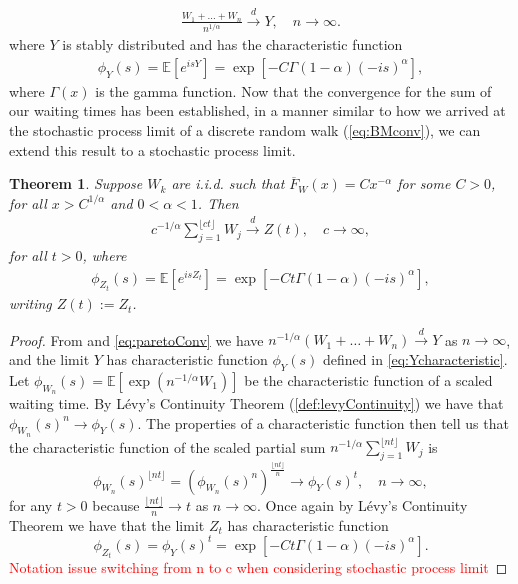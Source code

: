 \documentclass[honours,12pt]{UNSWthesis}
\newcommand{\E}{\mathbb{E}}
\newcommand{\1}{\mathbf 1}
\newcommand{\Floor}[1]{{\lfloor {#1} \rfloor}}
\newcommand{\cd}{\overset{d}{\longrightarrow}}
\newtheorem{theorem}{Theorem}[section]
\numberwithin{equation}{section}
\theoremstyle{definition}
\theoremstyle{remark}
\begin{document}
\begin{align}\label{eq:paretoConv}
	\frac{W_1 + \ldots + W_n}{n^{1/\alpha}} \overset{d}{\longrightarrow} Y, \quad n \to \infty.
\end{align}
\noindent where $Y$ is stably distributed and has the characteristic function
\begin{align}\label{eq:Ycharacteristic}
	\phi_Y(s)=\E[e^{isY}]=\exp[-C\Gamma(1-\alpha)(-is)^\alpha],
\end{align}
\noindent where $\Gamma(x)$ is the gamma function. Now that the convergence for the sum of our waiting times has been established, in a manner similar to how we arrived at the stochastic process limit of a discrete random walk (\ref{eq:BMconv}), we can extend this result to a stochastic process limit.
\begin{theorem}\cite[Th~3.41]{MeerschaertSikorskii2012}
Suppose $W_k$ are i.i.d. such that $\overline F_W(x)=Cx^{-\alpha}$ for some $C>0$, for all $x>C^{1/\alpha}$ and $0<\alpha<1$. Then
\begin{align}\label{eq:partialParetoSum}
	c^{-1/\alpha}\sum\limits^\Floor{ct}_{j=1} W_j \cd Z(t), \quad c \to \infty,
\end{align}
for all $t>0$, where
\begin{align}
	\phi_{Z_t}(s)=\E[e^{isZ_t}]=\exp[-Ct\Gamma(1-\alpha)(-is)^\alpha],
\end{align}
writing $Z(t):=Z_t$.
\end{theorem} 
\begin{proof}
From \cite[Th~3.39]{MeerschaertSikorskii2012} and \ref{eq:paretoConv} we have $n^{-1/\alpha}(W_1 + \ldots + W_n) \overset{d}{\longrightarrow} Y$ as $n \to \infty$, and the limit $Y$ has characteristic function $\phi_Y(s)$ defined in \ref{eq:Ycharacteristic}. Let $\phi_{W_n}(s)=\E[\exp(n^{-1/\alpha}W_1)]$ be the characteristic function of a scaled waiting time. By L\'{e}vy's Continuity Theorem (\ref{def:levyContinuity}) we have that $\phi_{W_n}(s)^n\to \phi_Y(s)$. The properties of a characteristic function then tell us that the characteristic function of the scaled partial sum $n^{-1/\alpha}\sum\limits^\Floor{nt}_{j=1} W_j$ is
\[
	\phi_{W_n}(s)^\Floor{nt}=\left(\phi_{W_n}(s)^n\right)^\frac{\Floor{nt}}{n}\to\phi_Y(s)^t,\quad n \to\infty,
\]
for any $t>0$ because $\frac{\Floor{nt}}{n}\to t$ as $n\to\infty$. Once again by L\'{e}vy's Continuity Theorem we have that the limit $Z_t$ has characteristic function
\[
	\phi_{Z_t}(s)=\phi_Y(s)^t=\exp[-Ct\Gamma(1-\alpha)(-is)^\alpha].
\]
\textcolor{red}{Notation issue switching from n to c when considering stochastic process limit}
\end{proof}
\end{document}
